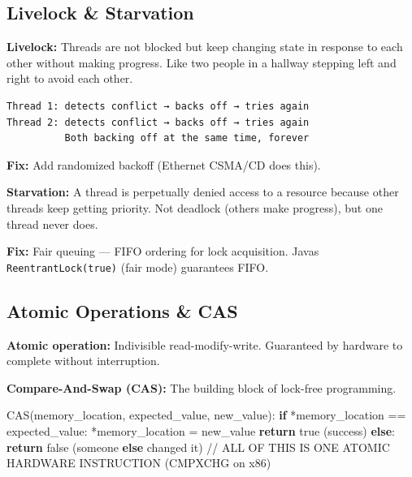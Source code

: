 \documentclass[11pt]{article}
\newenvironment{Shaded}{\begin{snugshade}}{\end{snugshade}}
\newcommand{\ControlFlowTok}[1]{\textcolor[rgb]{0.99,0.74,0.29}{\textbf{#1}}}
\newcommand{\NormalTok}[1]{\textcolor[rgb]{0.81,0.81,0.76}{#1}}
\newcommand{\OperatorTok}[1]{\textcolor[rgb]{0.81,0.81,0.76}{#1}}
\begin{document}
\subsection{Livelock \& Starvation}\label{livelock--starvation}

\textbf{Livelock:} Threads are not blocked but keep changing state in response to each other without making progress. Like two people in a hallway stepping left and right to avoid each other.

\setcodelang{}

\begin{verbatim}
Thread 1: detects conflict → backs off → tries again
Thread 2: detects conflict → backs off → tries again
          Both backing off at the same time, forever
\end{verbatim}

\textbf{Fix:} Add randomized backoff (Ethernet CSMA/CD does this).

\textbf{Starvation:} A thread is perpetually denied access to a resource because other threads keep getting priority. Not deadlock (others make progress), but one thread never does.

\textbf{Fix:} Fair queuing --- FIFO ordering for lock acquisition. Java\textquotesingle s \texttt{ReentrantLock(true)} (fair mode) guarantees FIFO.

\subsection{Atomic Operations \& CAS}\label{atomic-operations--cas}

\textbf{Atomic operation:} Indivisible read-modify-write. Guaranteed by hardware to complete without interruption.

\textbf{Compare-And-Swap (CAS):} The building block of lock-free programming.


\begin{Shaded}
\begin{Highlighting}[]
\NormalTok{CAS(memory\_location, expected\_value, new\_value):}
    \ControlFlowTok{if} \OperatorTok{*}\NormalTok{memory\_location }\OperatorTok{==}\NormalTok{ expected\_value:}
        \OperatorTok{*}\NormalTok{memory\_location }\OperatorTok{=}\NormalTok{ new\_value}
        \ControlFlowTok{return}\NormalTok{ true  (success)}
    \ControlFlowTok{else}\NormalTok{:}
        \ControlFlowTok{return}\NormalTok{ false (someone }\ControlFlowTok{else}\NormalTok{ changed it)}
    \OperatorTok{//}\NormalTok{ ALL OF THIS IS ONE ATOMIC HARDWARE INSTRUCTION (CMPXCHG on x86)}
\end{Highlighting}
\end{Shaded}
\end{document}
